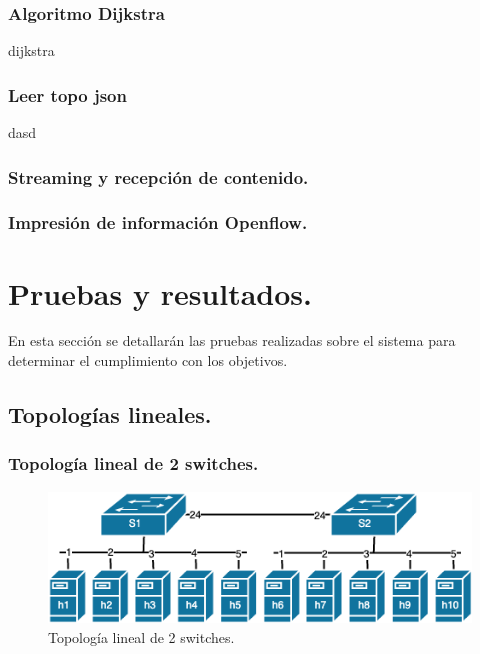 \documentclass[12pt,a4paper,oneside]{book}
\begin{document}
\subsection{Algoritmo Dijkstra}
dijkstra
\subsection{Leer topo json}
dasd
\subsection{Streaming y recepción de contenido.}

\subsection{Impresión de información Openflow.}

\chapter{Pruebas y resultados.}
\label{pruebasyresultados}

En esta sección se detallarán las pruebas realizadas sobre el sistema para determinar el cumplimiento con los objetivos.

\section{Topologías lineales.}

\subsection{Topología lineal de 2 switches.}

\begin{figure}[ht]
 \centering
 \includegraphics[width=1\textwidth]{fotos/5_Pruebas/1_topo_lineales/pequena.png}
 \caption{Topología lineal de 2 switches.}
 \label{topo_lineal_pequena}
\end{figure}


\vspace{0.5 cm}
\end{document}
